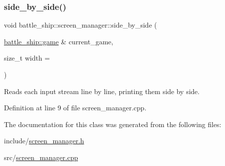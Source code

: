 \subsubsection{\texorpdfstring{side\+\_\+by\+\_\+side()}{side\_by\_side()}}
{\footnotesize\ttfamily void battle\+\_\+ship\+::screen\+\_\+manager\+::side\+\_\+by\+\_\+side (\begin{DoxyParamCaption}\item[{\hyperlink{classbattle__ship_1_1game}{battle\+\_\+ship\+::game} \&}]{current\+\_\+game,  }\item[{size\+\_\+t}]{width = {} }\end{DoxyParamCaption})\hspace{0.3cm}{\ttfamily [static]}}



Reads each input stream line by line, printing them side by side. 



Definition at line 9 of file screen\+\_\+manager.\+cpp.



The documentation for this class was generated from the following files\+:\begin{DoxyCompactItemize}
\item 
include/\hyperlink{screen__manager_8h}{screen\+\_\+manager.\+h}\item 
src/\hyperlink{screen__manager_8cpp}{screen\+\_\+manager.\+cpp}\end{DoxyCompactItemize}

